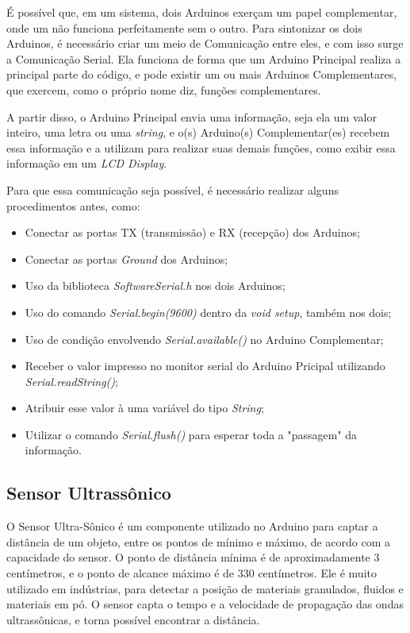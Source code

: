 \documentclass[conference]{IEEEtran}
\begin{document}
    É possível que, em um sistema, dois Arduinos exerçam um papel complementar, onde um não funciona
perfeitamente sem o outro. Para sintonizar os dois Arduinos, é necessário criar um meio de Comunicação
entre eles, e com isso surge a Comunicação Serial. Ela funciona de forma que um Arduino Principal realiza
a principal parte do código, e pode existir um ou mais Arduinos Complementares, que exercem, como o próprio
nome diz, funções complementares.

    A partir disso, o Arduino Principal envia uma informação, seja ela um valor inteiro, uma letra ou uma
\emph{string}, e o(s) Arduino(s) Complementar(es) recebem essa informação e a utilizam para realizar suas
demais funções, como exibir essa informação em um \emph{LCD Display}. 

    Para que essa comunicação seja possível, é necessário realizar alguns procedimentos antes, como:
    \begin{itemize}
        \item Conectar as portas TX (transmissão) e RX (recepção) dos Arduinos;
        \item Conectar as portas \emph{Ground} dos Arduinos;
        \item Uso da biblioteca \emph{SoftwareSerial.h} nos dois Arduinos;
        \item Uso do comando \emph{Serial.begin(9600)} dentro da \emph{void setup}, também nos dois;
        \item Uso de condição envolvendo \emph{Serial.available()} no Arduino Complementar;
        \item Receber o valor impresso no monitor serial do Arduino Pricipal utilizando 
        \emph{Serial.readString()};
        \item Atribuir esse valor à uma variável do tipo \emph{String};
        \item Utilizar o comando \emph{Serial.flush()} para esperar toda a "passagem" da informação.
    \end{itemize}

\subsection{Sensor Ultrassônico}

    O Sensor Ultra-Sônico é um componente utilizado no Arduino para captar a distância de um objeto, 
entre os pontos de mínimo e máximo, de acordo com a capacidade do sensor. O ponto de distância mínima 
é de aproximadamente 3 centímetros, e o ponto de alcance máximo é de 330 centímetros. Ele é muito
utilizado em indústrias, para detectar a posição de materiais granulados, fluidos e materiais em pó.
O sensor capta o tempo e a velocidade de propagação das ondas ultrassônicas, e torna possível encontrar
a distância.
\end{document}
